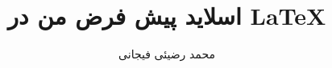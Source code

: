 \documentclass[xcolor=dvipsnames, professionalfont]{beamer}
\author{محمد رضیئی فیجانی}
\title{ اسلاید پیش فرض من در \LaTeX}
\institute{دانشگاه صنعتی امیرکبیر}
\begin{document}
\frame{\maketitle}
\begin{frame}


\end{frame}
\end{document}
